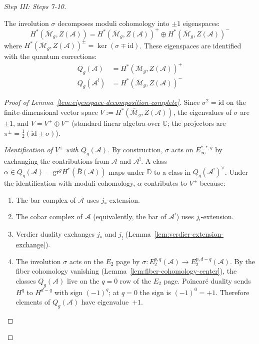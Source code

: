 \begin{proof}[Step III: Steps 7-10]
\begin{lemma}
\label{lem:eigenspace-decomposition-complete}
The involution $\sigma$ decomposes moduli cohomology into $\pm 1$
eigenspaces:
\begin{equation}
H^*(\overline{\mathcal{M}}_g, Z(\mathcal{A})) =
H^*(\overline{\mathcal{M}}_g, Z(\mathcal{A}))^+ \oplus
H^*(\overline{\mathcal{M}}_g, Z(\mathcal{A}))^-
\end{equation}
where $H^*(\overline{\mathcal{M}}_g, Z(\mathcal{A}))^\pm = \ker(\sigma \mp
\mathrm{id})$.  These eigenspaces are identified with the quantum corrections:
\begin{align}
Q_g(\mathcal{A}) &= H^*(\overline{\mathcal{M}}_g, Z(\mathcal{A}))^+\\
Q_g(\mathcal{A}^!) &= H^*(\overline{\mathcal{M}}_g, Z(\mathcal{A}))^-
\end{align}
\end{lemma}

\begin{proof}[Proof of Lemma~\ref{lem:eigenspace-decomposition-complete}]
Since $\sigma^2 = \mathrm{id}$ on the finite-dimensional vector space $V :=
H^*(\overline{\mathcal{M}}_g, Z(\mathcal{A}))$, the eigenvalues of $\sigma$ are
$\pm 1$, and $V = V^+ \oplus V^-$ (standard linear algebra over $\mathbb{C}$;
the projectors are $\pi^\pm = \frac{1}{2}(\mathrm{id} \pm \sigma)$).

\emph{Identification of $V^+$ with $Q_g(\mathcal{A})$.}
By construction, $\sigma$ acts on $E_\infty^{*,*,g}$ by exchanging the contributions
from $\mathcal{A}$ and $\mathcal{A}^!$.  A class $\alpha \in Q_g(\mathcal{A}) =
\mathrm{gr}^g H^*(\bar{B}(\mathcal{A}))$ maps under $\mathbb{D}$ to a class in
$Q_g(\mathcal{A}^!)^\vee$.  Under the identification with moduli cohomology,
$\alpha$ contributes to $V^+$ because:
\begin{enumerate}
\item The bar complex of $\mathcal{A}$ uses $j_*$-extension.
\item The cobar complex of $\mathcal{A}$ (equivalently, the bar of $\mathcal{A}^!$)
uses $j_!$-extension.
\item Verdier duality exchanges $j_*$ and $j_!$
(Lemma~\ref{lem:verdier-extension-exchange}).
\item The involution $\sigma$ acts on the $E_2$ page by
$\sigma: E_2^{p,q}(\mathcal{A}) \to E_2^{p,d-q}(\mathcal{A})$.
By the fiber cohomology vanishing
(Lemma~\ref{lem:fiber-cohomology-center}), the classes
$Q_g(\mathcal{A})$ live on the $q = 0$ row of the $E_2$ page.
Poincar\'e duality sends $H^q$ to $H^{d-q}$ with sign $(-1)^q$;
at $q = 0$ the sign is $(-1)^0 = +1$.  Therefore elements of
$Q_g(\mathcal{A})$ have eigenvalue~$+1$.
\end{enumerate}


\end{proof}
\end{proof}
